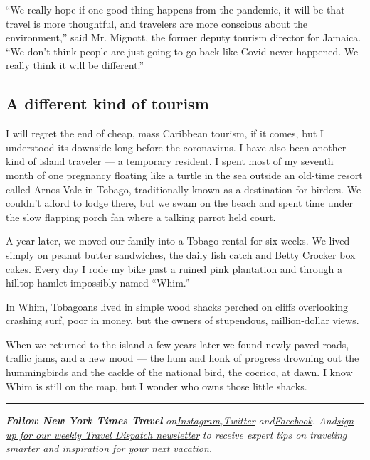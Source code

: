 ``We really hope if one good thing happens from the pandemic, it will be
that travel is more thoughtful, and travelers are more conscious about
the environment,'' said Mr. Mignott, the former deputy tourism director
for Jamaica. ``We don't think people are just going to go back like
Covid never happened. We really think it will be different.''

\hypertarget{a-different-kind-of-tourism}{%
\subsection{A different kind of
tourism}\label{a-different-kind-of-tourism}}

I will regret the end of cheap, mass Caribbean tourism, if it comes, but
I understood its downside long before the coronavirus. I have also been
another kind of island traveler --- a temporary resident. I spent most
of my seventh month of one pregnancy floating like a turtle in the sea
outside an old-time resort called Arnos Vale in Tobago, traditionally
known as a destination for birders. We couldn't afford to lodge there,
but we swam on the beach and spent time under the slow flapping porch
fan where a talking parrot held court.

A year later, we moved our family into a Tobago rental for six weeks. We
lived simply on peanut butter sandwiches, the daily fish catch and Betty
Crocker box cakes. Every day I rode my bike past a ruined pink
plantation and through a hilltop hamlet impossibly named ``Whim.''

In Whim, Tobagoans lived in simple wood shacks perched on cliffs
overlooking crashing surf, poor in money, but the owners of stupendous,
million-dollar views.

When we returned to the island a few years later we found newly paved
roads, traffic jams, and a new mood --- the hum and honk of progress
drowning out the hummingbirds and the cackle of the national bird, the
cocrico, at dawn. I know Whim is still on the map, but I wonder who owns
those little shacks.

\begin{center}\rule{0.5\linewidth}{\linethickness}\end{center}

\emph{\textbf{Follow New York Times Travel}}
\emph{on}\href{https://www.instagram.com/nytimestravel/}{\emph{Instagram}}\emph{,}\href{https://twitter.com/nytimestravel}{\emph{Twitter}}
\emph{and}\href{https://www.facebook.com/nytimestravel/}{\emph{Facebook}}\emph{.
And}\href{https://www.nytimes.com/newsletters/traveldispatch}{\emph{sign
up for our weekly Travel Dispatch newsletter}} \emph{to receive expert
tips on traveling smarter and inspiration for your next vacation.}

